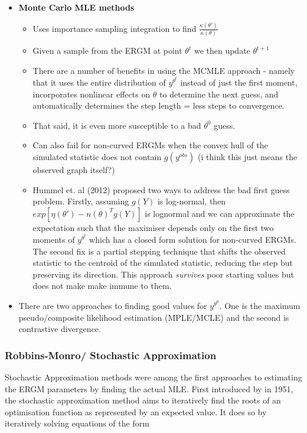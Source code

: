 \begin{itemize}
    \item \textbf{Monte Carlo MLE methods}
\begin{itemize}
    \item Uses importance sampling integration to find $\frac{\kappa(\theta')}{\kappa(\theta)}$
    \item Given a sample from the ERGM at point $\theta^{t}$ we then update $\theta^{t+1}$
    \item There are a number of benefits in using the MCMLE approach - namely that it uses the entire distribution of $y^{\theta^{t}}$ instead of just the first moment, incorporates nonlinear effects on $\theta$ to determine the next guess, and automatically determines the step length = less steps to convergence.
    \item That said, it is even more susceptible to a bad $\theta^{0}$ guess.
    \item Can also fail for non-curved ERGMs when the convex hull of the simulated statistic does not contain $g(y^{obs})$ (i think this just means the observed graph itself?)
    \item Hummel et. al (2012) proposed two ways to address the bad first guess problem. Firstly, assuming $g(Y)$ is log-normal, then $exp[{\eta(\theta') - n(\theta)}^{T}g(Y)]$ is lognormal and we can approximate the expectation such that the maximiser depends only on the first two moments of $y^{\theta^{t}}$ which has a closed form solution for non-curved ERGMs. The second fix is a partial stepping technique that shifts the observed statistic to the centroid of the simulated statistic, reducing the step but preserving its direction. This approach \emph{survives} poor starting values but does not make make immune to them.
\end{itemize}
    \item There are two approaches to finding good values for $y^{\theta^{0}}$. One is the maximum pseudo/composite likelihood estimation (MPLE/MCLE) and the second is contrastive divergence. 
\end{itemize}

\subsubsection{Robbins-Monro/ Stochastic Approximation}

Stochastic Approximation methods were among the first approaches to estimating the ERGM parameters by finding the actual MLE. First introduced by \citeauthor{robbinsmonro1951} in 1951, the stochastic approximation method aims to iteratively find the roots of an optimisation function as represented by an expected value. It does so by iteratively solving equations of the form 

